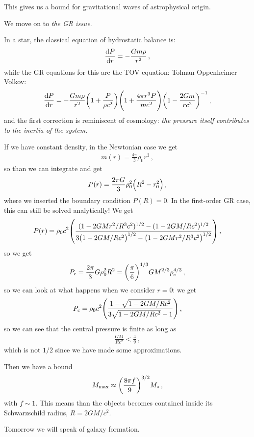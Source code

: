 \documentclass[main.tex]{subfiles}
\begin{document}
This gives us a bound for gravitational waves of astrophysical origin. 

We move on to \emph{the GR issue}. 

In a star, the classical equation of hydrostatic balance is:
%
\begin{align}
\dv{P}{r} = - \frac{Gm \rho }{r^2}
\,,
\end{align}
%
while the GR equations for this are the TOV equation: Tolman-Oppenheimer-Volkov: 
%
\begin{align}
\dv{P}{r} = - \frac{Gm  \rho }{r^2} \qty(1 + \frac{P}{\rho c^2}) \qty(1 + \frac{4 \pi r^3 P}{m c^2}) \qty(1 - \frac{2Gm}{rc^2})^{-1}
\,,
\end{align}
%
and the first correction is reminiscent of cosmology: \emph{the pressure itself contributes to the inertia of the system}. 

If we have constant density, in the Newtonian case we get 
%
\begin{align}
m(r) = \frac{4 \pi }{3} \rho_0 r^3
\,,
\end{align}
%
so than we can integrate and get 
%
\begin{align}
P(r) = \frac{2 \pi G}{3}  \rho_0^2 \qty(R^2 - r_0^2)
\,,
\end{align}
%
where we inserted the boundary condition \(P(R) = 0\). In the first-order GR case, this can still be solved analytically! We get 
%
\begin{align}
P(r) = \rho_0 c^2 \qty(\frac{(1 - 2GM r^2 / R^3 c^2)^{1/2} - (1 - 2GM / Rc^2)^{1/2}}{3 \qty(1 - 2GM / Rc^2)^{1/2} - \qty(1 - 2GM r^2 / R^3c^2)^{1/2}})
\,,
\end{align}
%
so we get 
%
\begin{align}
P_c = \frac{2 \pi }{3} G \rho_0^2R^2 = \qty(\frac{\pi }{6})^{1/3} GM^{2/3} \rho_{c}^{4/3}
\,,
\end{align}
%
so we can look at what happens when we consider \(r=0\): we get 
%
\begin{align}
P_c = \rho_0 c^2 \qty(\frac{1 - \sqrt{1 - 2GM / Rc^2}}{3 \sqrt{1 - 2GM / Rc^2} - 1})
\,,
\end{align}
%
so we can see that the central pressure is finite as long as 
%
\begin{align}
\frac{GM}{Rc^2} < \frac{4}{9}
\,,
\end{align}
%
which is not \(1/2\) since we have made some approximations. 

Then we have a bound 
%
\begin{align}
M _{\text{max}} \approx \qty(\frac{8 \pi f}{9})^{3/2} M_{*}
\,,
\end{align}
%
with \(f \sim 1\). This means than the objects becomes contained inside its Schwarzschild radius, \(R = 2GM/c^2\). 

Tomorrow we will speak of galaxy formation. 
\end{document}
